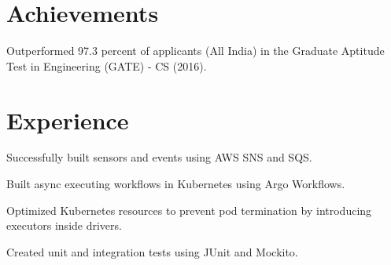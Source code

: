 \documentclass[]{deedy-resume-openfont}
\begin{document}
\begin{minipage}[t]{0.33\textwidth}
        \section{Achievements}
        \textbullet{} Outperformed 97.3 percent of applicants (All India) in the Graduate Aptitude Test in Engineering (GATE) - CS (2016).
        \sectionsep

%
%

    \end{minipage}
    \hfill
    \begin{minipage}[t]{0.66\textwidth}


        \section{Experience}

        \vspace{\topsep} %
        \begin{tightemize}

            \item Successfully built sensors and events using AWS SNS and SQS.
            \item Built async executing workflows in Kubernetes using Argo Workflows.
            \item Optimized Kubernetes resources to prevent pod termination by introducing executors inside drivers.
            \item Created unit and integration tests using JUnit and Mockito.
            \sectionsep


\end{tightemize}
\end{minipage}
\end{document}
